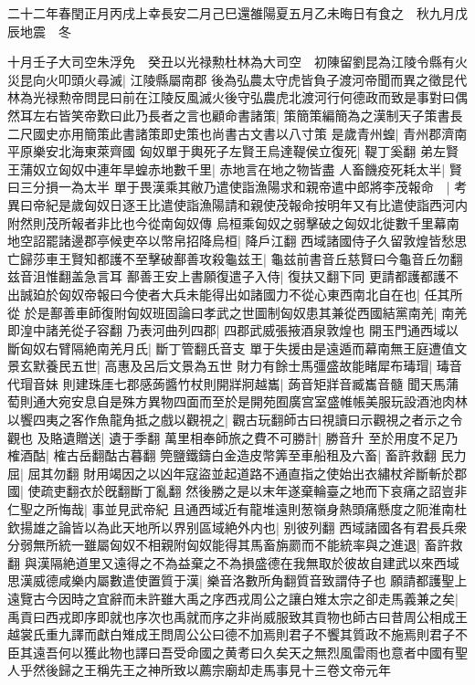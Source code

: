 二十二年春閏正月丙戌上幸長安二月己巳還雒陽夏五月乙未晦日有食之　秋九月戊辰地震　冬

十月壬子大司空朱浮免　癸丑以光禄勲杜林為大司空　初陳留劉昆為江陵令縣有火災昆向火叩頭火尋滅|{
	江陵縣屬南郡}
後為弘農太守虎皆負子渡河帝聞而異之徵昆代林為光禄勲帝問昆曰前在江陵反風滅火後守弘農虎北渡河行何德政而致是事對曰偶然耳左右皆笑帝歎曰此乃長者之言也顧命書諸策|{
	策簡策編簡為之漢制天子策書長二尺國史亦用簡策此書諸策即史策也尚書古文書以八寸策}
是歲青州蝗|{
	青州郡濟南平原樂安北海東萊齊國}
匈奴單于輿死子左賢王烏達鞮侯立復死|{
	鞮丁奚翻}
弟左賢王蒲奴立匈奴中連年旱蝗赤地數千里|{
	赤地言在地之物皆盡}
人畜饑疫死耗太半|{
	賢曰三分損一為太半}
單于畏漢乘其敝乃遣使詣漁陽求和親帝遣中郎將李茂報命　|{
	考異曰帝紀是歲匈奴日逐王比遣使詣漁陽請和親使茂報命按明年又有比遣使詣西河内附然則茂所報者非比也今從南匈奴傳}
烏桓乘匈奴之弱擊破之匈奴北徙數千里幕南地空詔罷諸邊郡亭候吏卒以幣帛招降烏桓|{
	降戶江翻}
西域諸國侍子久留敦煌皆愁思亡歸莎車王賢知都護不至擊破鄯善攻殺龜兹王|{
	龜兹前書音丘慈賢曰今龜音丘勿翻兹音沮惟翻盖急言耳}
鄯善王安上書願復遣子入侍|{
	復扶又翻下同}
更請都護都護不出誠廹於匈奴帝報曰今使者大兵未能得出如諸國力不從心東西南北自在也|{
	任其所從}
於是鄯善車師復附匈奴班固論曰孝武之世圖制匈奴患其兼從西國結黨南羌|{
	南羌即湟中諸羌從子容翻}
乃表河曲列四郡|{
	四郡武威張掖酒泉敦煌也}
開玉門通西域以斷匈奴右臂隔絶南羌月氏|{
	斷丁管翻氏音支}
單于失援由是遠遁而幕南無王庭遭值文景玄默養民五世|{
	高惠及呂后文景為五世}
財力有餘士馬彊盛故能睹犀布瑇瑁|{
	瑇音代瑁音妹}
則建珠厓七郡感蒟醬竹杖則開牂牁越巂|{
	蒟音矩牂音臧巂音髓}
聞天馬蒲萄則通大宛安息自是殊方異物四面而至於是開苑囿廣宫室盛帷帳美服玩設酒池肉林以饗四夷之客作魚龍角抵之戲以觀視之|{
	觀古玩翻師古曰視讀曰示觀視之者示之令觀也}
及賂遺贈送|{
	遺于季翻}
萬里相奉師旅之費不可勝計|{
	勝音升}
至於用度不足乃榷酒酤|{
	榷古岳翻酤古暮翻}
筦鹽鐵鑄白金造皮幣筭至車船租及六畜|{
	畜許救翻}
民力屈|{
	屈其勿翻}
財用竭因之以凶年寇盜並起道路不通直指之使始出衣繡杖斧斷斬於郡國|{
	使疏吏翻衣於旣翻斷丁亂翻}
然後勝之是以末年遂棄輪臺之地而下哀痛之詔豈非仁聖之所悔哉|{
	事並見武帝紀}
且通西域近有龍堆遠則葱嶺身熱頭痛懸度之阨淮南杜欽揚雄之論皆以為此天地所以界别區域絶外内也|{
	别彼列翻}
西域諸國各有君長兵衆分弱無所統一雖屬匈奴不相親附匈奴能得其馬畜旃罽而不能統率與之進退|{
	畜許救翻}
與漢隔絶道里又遠得之不為益棄之不為損盛德在我無取於彼故自建武以來西域思漢威德咸樂内屬數遣使置質于漢|{
	樂音洛數所角翻質音致謂侍子也}
願請都護聖上遠覽古今因時之宜辭而未許雖大禹之序西戎周公之讓白雉太宗之卻走馬義兼之矣|{
	禹貢曰西戎即序即就也序次也禹就而序之非尚威服致其貢物也師古曰昔周公相成王越裳氏重九譯而獻白雉成王問周公公曰德不加焉則君子不饗其質政不施焉則君子不臣其遠吾何以獲此物也譯曰吾受命國之黄耉曰久矣天之無烈風雷雨也意者中國有聖人乎然後歸之王稱先王之神所致以薦宗廟却走馬事見十三卷文帝元年}


